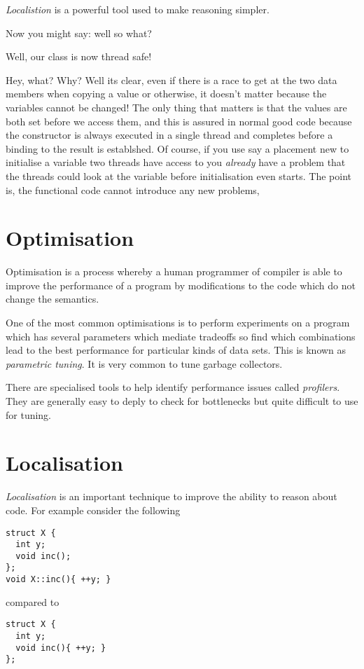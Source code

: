 \documentclass[oneside]{book}
\begin{document}
{\em Localistion} is a powerful tool used to make reasoning simpler.

Now you might say: well so what?

Well, our class is now thread safe!

Hey, what? Why? Well its clear, even if there is a race to get
at the two data members when copying a value or otherwise, it doesn't
matter because the variables cannot be changed! The only thing that
matters is that the values are both set before we access them,
and this is assured in normal good code because the constructor
is always executed in a single thread and completes before a binding
to the result is establshed. Of course, if you use say a placement
new to initialise a variable two threads have access to you 
{\em already} have a problem that the threads could look at the variable
before initialisation even starts. The point is, the functional code
cannot introduce any new problems,

\section{Optimisation}
Optimisation is a process whereby a human programmer of compiler
is able to improve the performance of a program by modifications
to the code which do not change the semantics.

One of the most common optimisations is to perform experiments on
a program which has several parameters which mediate tradeoffs
so find which combinations lead to the best performance for
particular kinds of data sets. This is known as {\em parametric tuning}.
It is very common to tune garbage collectors.

There are specialised tools to help identify performance issues
called {\em profilers}. They are generally easy to deply to check for
bottlenecks but quite difficult to use for tuning.

\section{Localisation}
{\em Localisation} is an important technique to improve the ability
to reason about code. For example consider the following

\begin{verbatim}
struct X {
  int y;
  void inc();
};
void X::inc(){ ++y; }
\end{verbatim} 

compared to

\begin{verbatim}
struct X {
  int y;
  void inc(){ ++y; }
};
\end{verbatim} 
\end{document}
